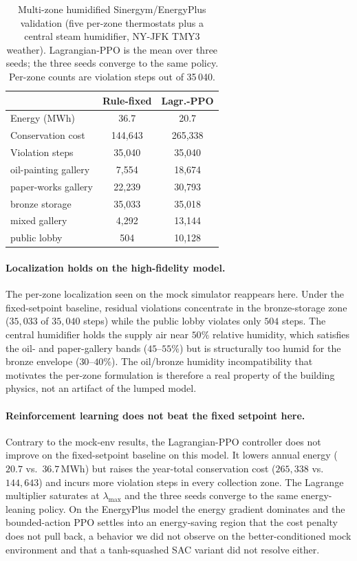 \begin{table}[t]
\centering
\caption{Multi-zone humidified Sinergym/EnergyPlus validation (five
per-zone thermostats plus a central steam humidifier, NY-JFK TMY3
weather). Lagrangian-PPO is the mean over three seeds; the three seeds
converge to the same policy. Per-zone counts are violation steps out of
35\,040.}
\label{tab:sinergym}
\small
\setlength{\tabcolsep}{4pt}
\begin{tabular}{lcc}
\toprule
& Rule-fixed & Lagr.-PPO \\
\midrule
Energy (MWh)            & 36.7    & 20.7 \\
Conservation cost       & 144{,}643 & 265{,}338 \\
Violation steps         & 35{,}040  & 35{,}040 \\
\midrule
oil-painting gallery    & 7{,}554   & 18{,}674 \\
paper-works gallery     & 22{,}239  & 30{,}793 \\
bronze storage          & 35{,}033  & 35{,}018 \\
mixed gallery           & 4{,}292   & 13{,}144 \\
public lobby            & 504       & 10{,}128 \\
\bottomrule
\end{tabular}
\end{table}

\paragraph{Localization holds on the high-fidelity model.}
The per-zone localization seen on the mock simulator reappears here.
Under the fixed-setpoint baseline, residual violations concentrate in
the bronze-storage zone ($35{,}033$ of $35{,}040$ steps) while the
public lobby violates only $504$ steps. The central humidifier holds
the supply air near $50\%$ relative humidity, which satisfies the oil-
and paper-gallery bands ($45$--$55\%$) but is structurally too humid
for the bronze envelope ($30$--$40\%$). The oil/bronze humidity
incompatibility that motivates the per-zone formulation is therefore a
real property of the building physics, not an artifact of the lumped
model.

\paragraph{Reinforcement learning does not beat the fixed setpoint here.}
Contrary to the mock-env results, the Lagrangian-PPO controller does
not improve on the fixed-setpoint baseline on this model. It lowers
annual energy ($20.7$ vs.\ $36.7$\,MWh) but raises the year-total
conservation cost ($265{,}338$ vs.\ $144{,}643$) and incurs more
violation steps in every collection zone. The Lagrange multiplier
saturates at $\lambda_{\max}$ and the three seeds converge to the same
energy-leaning policy. On the EnergyPlus model the energy gradient
dominates and the bounded-action PPO settles into an energy-saving
region that the cost penalty does not pull back, a behavior we did not
observe on the better-conditioned mock environment and that a
tanh-squashed SAC variant did not resolve either.

